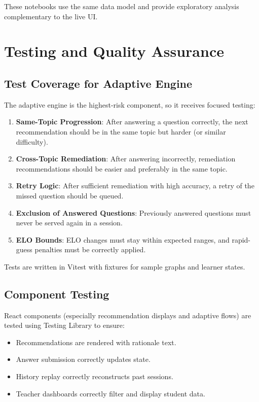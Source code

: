 \documentclass[sigconf,authordraft,twoside]{acmart}
\begin{document}
These notebooks use the same data model and provide exploratory analysis complementary to the live UI.

\section{Testing and Quality Assurance}

\subsection{Test Coverage for Adaptive Engine}

The adaptive engine is the highest-risk component, so it receives focused testing:

\begin{enumerate}
\item \textbf{Same-Topic Progression}: After answering a question correctly, the next recommendation should be in the same topic but harder (or similar difficulty).

\item \textbf{Cross-Topic Remediation}: After answering incorrectly, remediation recommendations should be easier and preferably in the same topic.

\item \textbf{Retry Logic}: After sufficient remediation with high accuracy, a retry of the missed question should be queued.

\item \textbf{Exclusion of Answered Questions}: Previously answered questions must never be served again in a session.

\item \textbf{ELO Bounds}: ELO changes must stay within expected ranges, and rapid-guess penalties must be correctly applied.
\end{enumerate}

Tests are written in Vitest with fixtures for sample graphs and learner states.

\subsection{Component Testing}

React components (especially recommendation displays and adaptive flows) are tested using Testing Library to ensure:

\begin{itemize}
\item Recommendations are rendered with rationale text.
\item Answer submission correctly updates state.
\item History replay correctly reconstructs past sessions.
\item Teacher dashboards correctly filter and display student data.
\end{itemize}
\end{document}
